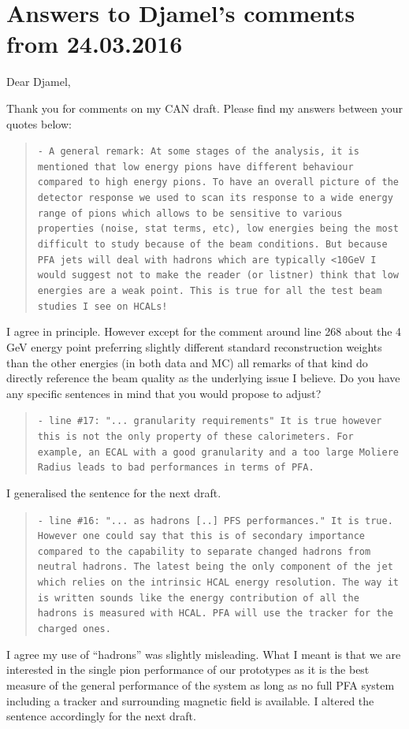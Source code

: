 \documentclass[twoside,a4paper,12pt]{article}
\begin{document}




\section*{Answers to Djamel's comments from 24.03.2016}
Dear Djamel,

Thank you for comments on my CAN draft. Please find my answers between your quotes below:

\begin{quote}\texttt{- A general remark:
At some stages of the analysis, it is mentioned that low energy pions have different behaviour compared to high energy pions. To have an overall picture of the detector response we used to scan its response to a wide energy range of pions which allows to be sensitive to various properties (noise, stat terms, etc), low energies being the most difficult to study because of the beam conditions.
But because PFA jets will deal with hadrons which are typically <10GeV I would suggest not to make the reader (or listner) think that low energies are a weak point. This is true for all the test beam studies I see on HCALs!}\end{quote}
I agree in principle. However except for the comment around line 268 about the 4\,GeV energy point preferring slightly different standard reconstruction weights than the other energies (in both data and MC) all remarks of that kind do directly reference the beam quality as the underlying issue I believe. Do you have any specific sentences in mind that you would propose to adjust? 

\begin{quote}\texttt{- line \#17: "... granularity requirements"
It is true however this is not the only property of these calorimeters. For example, an ECAL with a good granularity and a too large Moliere Radius leads to bad performances in terms of PFA.}\end{quote}
I generalised the sentence for the next draft.

\begin{quote}\texttt{- line \#16: "... as hadrons [..] PFS performances."
It is true. However one could say that this is of secondary importance compared to the capability to separate changed hadrons from neutral hadrons. The latest being the only component of the jet which relies on the intrinsic HCAL energy resolution. The way it is written sounds like the energy contribution of all the hadrons is measured with HCAL. PFA will use the tracker for the charged ones.}\end{quote}
I agree my use of ``hadrons'' was slightly misleading. What I meant is that we are interested in the single pion performance of our prototypes as it is the best measure of the general performance of the system as long as no full PFA system including a tracker and surrounding magnetic field is available. I altered the sentence accordingly for the next draft. 
\end{document}

